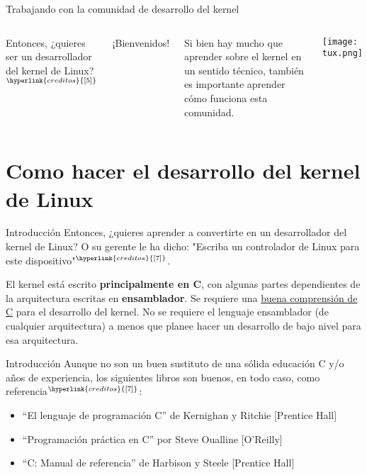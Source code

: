 \begin{frame}[c]{Trabajando con la comunidad de desarrollo del kernel}
  \begin{columns}
      Entonces, ¿quieres ser un desarrollador del kernel de
      Linux?$^{\hyperlink{creditos}{[5]}}$

      \vspace{\baselineskip}
      \begin{center}
        ¡Bienvenidos!
      \end{center}

      \vspace{\baselineskip}
      Si bien hay mucho que aprender sobre el kernel en un sentido técnico,
      también es importante aprender cómo funciona esta comunidad.
      \begin{center}
        \texttt{[image: tux.png]}
      \end{center}
  \end{columns}
\end{frame}

\section{Como hacer el desarrollo del kernel de Linux}

\begin{frame}[c]{Introducción}
  Entonces, ¿quieres aprender a convertirte en un desarrollador del kernel
  de Linux? O su gerente le ha dicho: "Escriba un controlador de Linux para
  este dispositivo"$^{\hyperlink{creditos}{[7]}}$.

  \vspace{\baselineskip}
  El kernel está escrito \textbf{principalmente en C}, con algunas partes
  dependientes de la arquitectura escritas en \textbf{ensamblador}.
  Se requiere una \underline{buena
  comprensión de C} para el desarrollo del kernel. No se requiere
  el lenguaje ensamblador (de cualquier arquitectura) a menos que planee
  hacer un desarrollo de bajo nivel para esa arquitectura.

\end{frame}

\begin{frame}[c]{Introducción}
  Aunque no son un buen sustituto de una sólida educación C y/o años de
  experiencia, los siguientes libros son buenos, en todo caso,
  como referencia$^{\hyperlink{creditos}{[7]}}$:

  \vspace{\baselineskip}
  \begin{itemize}
    \item “El lenguaje de programación C” de Kernighan y Ritchie [Prentice Hall]
    \item “Programación práctica en C” por Steve Oualline [O'Reilly]
    \item “C: Manual de referencia” de Harbison y Steele [Prentice Hall]
  \end{itemize}
\end{frame}

